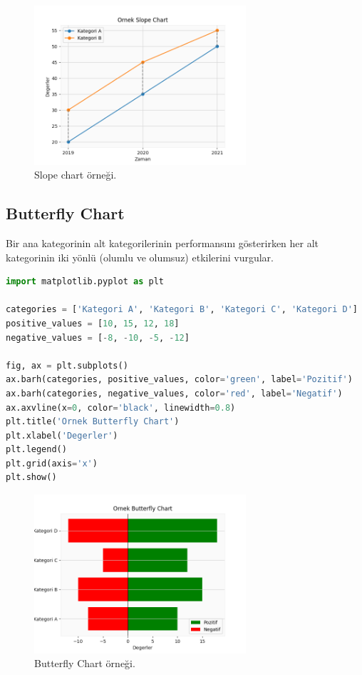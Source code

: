 \begin{figure}[h]
    \centering
    \includegraphics[width=0.7\textwidth]{images/slope_chart.png}
    \caption{Slope chart örneği.}
    \label{fig:enter-label}
\end{figure}

\newpage

\subsection{Butterfly Chart}
Bir ana kategorinin alt kategorilerinin performansını gösterirken her alt kategorinin iki yönlü (olumlu ve olumsuz) etkilerini vurgular.

\begin{lstlisting}[language=Python]
import matplotlib.pyplot as plt

categories = ['Kategori A', 'Kategori B', 'Kategori C', 'Kategori D']
positive_values = [10, 15, 12, 18]
negative_values = [-8, -10, -5, -12]

fig, ax = plt.subplots()
ax.barh(categories, positive_values, color='green', label='Pozitif')
ax.barh(categories, negative_values, color='red', label='Negatif')
ax.axvline(x=0, color='black', linewidth=0.8)
plt.title('Ornek Butterfly Chart')
plt.xlabel('Degerler')
plt.legend()
plt.grid(axis='x')
plt.show()
\end{lstlisting}

\begin{figure}[h]
    \centering
    \includegraphics[width=0.7\textwidth]{images/butterfly_chart.png}
    \caption{Butterfly Chart örneği.}
    \label{fig:enter-label}
\end{figure}

